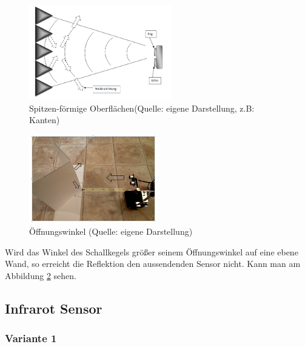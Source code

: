 \begin{figure}[!h]  %
	\centering\includegraphics[width=0.55\textwidth]{images/Bild-6.png}
	\caption{Spitzen-förmige Oberflächen\newline(Quelle: eigene Darstellung, z.B: Kanten)}
	\label{bild_6}
\end{figure}

\begin{figure}[!h]  %
	\centering\includegraphics[width=0.5\textwidth]{images/Bild-7.png}
	\caption{Öffnungswinkel (Quelle: eigene Darstellung)}
	\label{bild_7} %
\end{figure}

Wird das Winkel des Schallkegels größer seinem Öffnungswinkel auf eine ebene Wand, so erreicht die Reflektion den aussendenden Sensor nicht. Kann man am Abbildung \ref{bild_7} sehen.

\subsection{Infrarot Sensor}
		
\subsubsection{	Variante 1}

